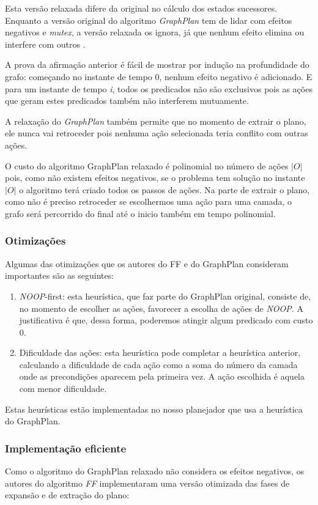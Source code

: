 Esta versão relaxada difere da original no cálculo dos estados sucessores.
Enquanto a versão original do algoritmo \textit{GraphPlan} tem de lidar com efeitos negativos e \textit{mutex}, a versão relaxada os ignora, já que nenhum efeito elimina ou interfere com outros \cite{hoffmann2001ff}.

A prova da afirmação anterior é fácil de mostrar por indução na profundidade do grafo: começando no instante de tempo 0, nenhum efeito negativo é adicionado.
E para um instante de tempo \textit{i}, todos os predicados não são exclusivos pois as ações que geram estes predicados também não interferem mutuamente.

A relaxação do \textit{GraphPlan} também permite que no momento de extrair o plano, ele nunca vai retroceder pois nenhuma ação selecionada teria conflito com outras ações.

O custo do algoritmo GraphPlan relaxado é polinomial no número de ações $\vert O \vert$ pois, como não existem efeitos negativos, se o problema tem solução no instante $\vert O \vert$ o algoritmo terá criado todos os passos de ações.
Na parte de extrair o plano, como não é preciso retroceder se escolhermos uma ação para uma camada, o grafo será percorrido do final até o inicio também em tempo polinomial.

\subsubsection{Otimizações}\label{heuristicas:noop}
Algumas das otimizações que os autores do FF e do GraphPlan consideram importantes são as seguintes:

\begin{enumerate}
\item \textit{NOOP}-first: esta heurística, que faz parte do GraphPlan original, consiste de, no momento de escolher as ações, favorecer a escolha de ações de \textit{NOOP}. A justificativa é que, dessa forma, poderemos atingir algum predicado com custo 0.
\item Dificuldade das ações: esta heurística pode completar a heurística anterior, calculando a dificuldade de cada ação como a soma do número da camada onde as precondições aparecem pela primeira vez. A ação escolhida é aquela com menor dificuldade.
\end{enumerate}

Estas heurísticas estão implementadas no nosso planejador que usa a heurística do GraphPlan.

\subsubsection{Implementação eficiente}\label{heuristicas:opt}
Como o algoritmo do GraphPlan relaxado não considera os efeitos negativos, os autores do algoritmo \textit{FF} implementaram uma versão otimizada das fases de expansão e de extração do plano:

